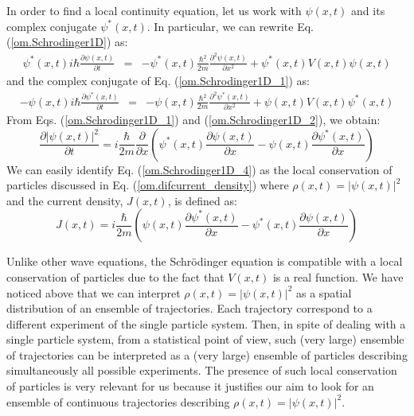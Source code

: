 \documentclass[nofootinbib, secnumarabic, amsmath, nobibnotes,11pt,aps,pra, floatfix]{revtex4-1}
\newcommand{\eref}[1]{Eq. (\ref{#1})}
\begin{document}
In order to find a local continuity equation, let us work with $\psi(x,t)$ and its complex conjugate $\psi^*(x,t)$. In particular, we can rewrite \eref{om.Schrodinger1D} as:
\begin{eqnarray}
\psi^*(x,t) i \hbar \frac{\partial \psi(x,t)} {\partial t} &=& -\psi^*(x,t)\frac {\hbar^2} {2m} \frac{ {\partial}^2 \psi(x,t)} {\partial x^2}+ \psi^*(x,t) V(x,t) \psi(x,t)
\label{om.Schrodinger1D_1}
\end{eqnarray}
and the complex conjugate of \eref{om.Schrodinger1D_1} as:
\begin{eqnarray}
-\psi(x,t)i \hbar \frac{\partial \psi^*(x,t)} {\partial t} &=& -\psi(x,t)\frac {\hbar^2} {2m} \frac{ {\partial}^2 \psi^*(x,t)} {\partial x^2}+ \psi(x,t)V(x,t) \psi^*(x,t)
\label{om.Schrodinger1D_2}
\end{eqnarray}
From Eqs. (\ref{om.Schrodinger1D_1}) and (\ref{om.Schrodinger1D_2}), we obtain:
\begin{equation}
\label{om.Schrodinger1D_4}
 \frac{\partial |\psi(x,t)|^2} {\partial t} = i\frac {\hbar} {2m} \frac {\partial} {\partial x} \left(\psi^*(x,t) \frac{ {\partial} \psi(x,t)} {\partial x} - \psi(x,t) \frac{ {\partial} \psi^*(x,t)} {\partial x} \right)
\end{equation}
We can easily identify \eref{om.Schrodinger1D_4} as the local conservation of particles discussed in \eref{om.difcurrent_density} where $\rho(x,t) = |\psi(x,t)|^2$ and the current density, $J(x,t)$, is defined as:
\begin{equation}
\label{om.current}
J(x,t) = i \frac {\hbar} {2 m} \left(\psi(x,t) \frac {\partial \psi^{*}(x,t)} {\partial x}- \psi^{*}(x,t) \frac {\partial \psi(x,t)} {\partial x} \right)
\end{equation}

Unlike other  wave equations, the Schr\"odinger equation is compatible
with a local conservation of particles due to the fact that $V(x,t)$
is a real function. We have noticed above that we can interpret
$\rho(x,t) = |\psi(x,t)|^2$ as a spatial distribution of an ensemble
of trajectories. Each trajectory correspond to a different experiment of the single particle system. Then, in spite of dealing with a single particle system, from a statistical point of view, such (very large) ensemble of trajectories can be interpreted as a (very large) ensemble of particles describing simultaneously all possible experiments. The presence of such local
conservation of particles is very relevant for us because it
justifies our aim to look for an ensemble of continuous trajectories
describing $\rho(x,t) = |\psi(x,t)|^2$.
\end{document}
